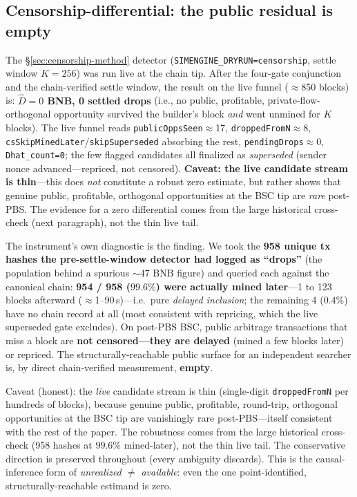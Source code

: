 \documentclass[11pt]{article}
\newcommand{\code}[1]{\texttt{#1}}
\begin{document}
\subsection{Censorship-differential: the public residual is empty}
\label{sec:censorship-results}
The \S\ref{sec:censorship-method} detector (\code{SIMENGINE\_DRYRUN=censorship}, settle
window $K=256$) was run live at the chain tip. After the four-gate conjunction and the
chain-verified settle window, the result on the live funnel ($\approx$850 blocks) is:
\textbf{$\hat D = 0$ BNB, 0 settled drops} (i.e., no public, profitable,
private-flow-orthogonal opportunity survived the builder's block \emph{and} went unmined
for $K$ blocks). The live funnel reads \code{publicOppsSeen}$\approx$17,
\code{droppedFromN}$\approx$8, \code{csSkipMinedLater}/\code{skipSuperseded} absorbing the
rest, \code{pendingDrops}$\approx$0, \code{Dhat\_count=0}; the few flagged candidates all
finalized as \emph{superseded} (sender nonce advanced---repriced, not censored).
\textbf{Caveat: the live candidate stream is thin}---this does \emph{not} constitute a
robust zero estimate, but rather shows that genuine public, profitable, orthogonal
opportunities at the BSC tip are \emph{rare} post-PBS. The evidence for a zero
differential comes from the large historical cross-check (next paragraph), not the thin
live tail.

The instrument's own diagnostic is the finding. We took the \textbf{958 unique tx hashes
the pre-settle-window detector had logged as ``drops''} (the population behind a spurious
$\sim$47 BNB figure) and queried each against the canonical chain: \textbf{954 / 958
($99.6\%$) were actually mined later}---1 to 123 blocks afterward ($\approx$1--90\,s)---i.e.\
pure \emph{delayed inclusion}; the remaining 4 ($0.4\%$) have no chain record at all
(most consistent with repricing, which the live superseded gate excludes). On post-PBS
BSC, public arbitrage transactions that miss a block are \textbf{not censored---they are
delayed} (mined a few blocks later) or repriced. The structurally-reachable public
surface for an independent searcher is, by direct chain-verified measurement,
\textbf{empty}.

Caveat (honest): the \emph{live} candidate stream is thin (single-digit
\code{droppedFromN} per hundreds of blocks), because genuine public, profitable,
round-trip, orthogonal opportunities at the BSC tip are vanishingly rare
post-PBS---itself consistent with the rest of the paper. The robustness comes from the
large historical cross-check (958 hashes at $99.6\%$ mined-later), not the thin live
tail. The conservative direction is preserved throughout (every ambiguity discards).
This is the causal-inference form of \emph{unrealized $\neq$ available}: even the one
point-identified, structurally-reachable estimand is zero.
\end{document}
